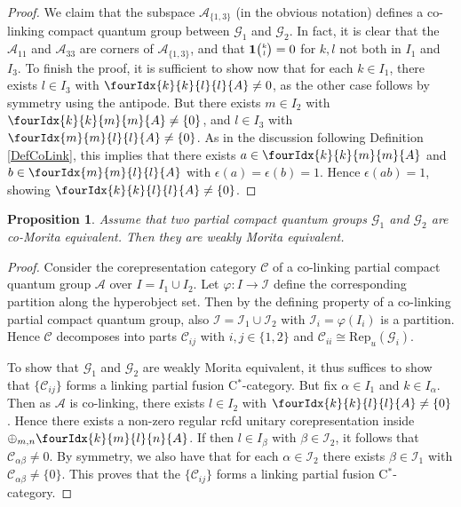 \documentclass[10pt]{article}
\newcommand{\CatC}{\mathcal{C}}
\newcommand{\CatCC}{\mathscr{C}}
\newcommand{\Rep}{\mathrm{Rep}}
\newcommand{\Grt}[3]{#1{\tiny {\begin{pmatrix} #2\\#3\end{pmatrix}}}}
\newcommand{\UnitC}[2]{\Grt{\mathbf{1}}{#1}{#2}}
\newcommand{\Gr}[5]{\fourIdx{#2}{#4}{#3}{#5}{#1}}%
\newtheorem{Prop}[Theorem]{Proposition}
\theoremstyle{definition}
\numberwithin{equation}{section}
\begin{document}
\begin{proof}
We claim that the subspace $\mathscr{A}_{\{1,3\}}$ (in the obvious notation) defines a co-linking compact quantum group between $\mathscr{G}_1$ and $\mathscr{G}_2$. In fact, it is clear that the $\mathscr{A}_{11}$ and $\mathscr{A}_{33}$ are corners of $\mathscr{A}_{\{1,3\}}$, and that $\UnitC{k}{l}=0$ for $k,l$ not both in $I_1$ and $I_{3}$. To finish the proof, it is sufficient to show now that for each $k\in I_1$, there exists $l\in I_{3}$ with $\Gr{A}{k}{l}{k}{l}\neq 0$, as the other case follows by symmetry using the antipode. But there exists $m\in I_2$ with $\Gr{A}{k}{m}{k}{m} \neq \{0\}$, and $l\in I_3$ with $\Gr{A}{m}{l}{m}{l}\neq\{0\}$. As in the discussion following Definition \ref{DefCoLink}, this implies that there exists $a\in \Gr{A}{k}{m}{k}{m}$ and $b\in \Gr{A}{m}{l}{m}{l}$ with $\epsilon(a)=\epsilon(b)=1$. Hence $\epsilon(ab)=1$, showing $\Gr{A}{k}{l}{k}{l}\neq \{0\}$.
\end{proof} 

\begin{Prop}\label{PropCoWeak} Assume that two partial compact quantum groups $\mathscr{G}_1$ and $\mathscr{G}_2$ are co-Morita equivalent. Then they are weakly Morita equivalent.
\end{Prop} 
\begin{proof} 
Consider the corepresentation category $\CatCC$ of a co-linking partial compact quantum group $\mathscr{A}$ over $I = I_1\cup I_2$. Let $\varphi:I\rightarrow \mathscr{I}$ define the corresponding partition along the hyperobject set. Then by the defining property of a co-linking partial compact quantum group, also $\mathscr{I} = \mathscr{I}_1\cup \mathscr{I}_2$ with $\mathscr{I}_i=\varphi(I_i)$ is a partition. Hence $\CatCC$ decomposes into parts $\CatCC_{ij}$ with $i,j\in \{1,2\}$ and $\CatC_{ii}\cong \Rep_u(\mathscr{G}_i)$. 

To show that $\mathscr{G}_1$ and $\mathscr{G}_2$ are weakly Morita equivalent, it thus suffices to show that $\{\CatCC_{ij}\}$ forms a linking partial fusion C$^*$-category. But fix $\alpha\in I_1$ and $k\in I_{\alpha}$. Then as $\mathscr{A}$ is co-linking, there exists $l \in I_2$ with $\Gr{A}{k}{l}{k}{l}\neq \{0\}$. Hence there exists a non-zero regular rcfd unitary corepresentation inside $\oplus_{m,n}\Gr{A}{k}{l}{m}{n}$. If then $l\in I_{\beta}$ with $\beta\in \mathscr{I}_2$, it follows that $\CatC_{\alpha\beta}\neq 0$. By symmetry, we also have that for each $\alpha \in \mathscr{I}_2$ there exists $\beta \in \mathscr{I}_1$ with $\CatC_{\alpha\beta}\neq \{0\}$. This proves that the $\{\CatCC_{ij}\}$ forms a linking partial fusion C$^*$-category.
\end{proof}
\end{document}
